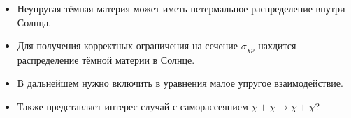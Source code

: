 \begin{itemize}
	\item Неупругая тёмная материя может иметь нетермальное распределение внутри Солнца.
	\item Для получения корректных ограничения на сечение $\sigma_{\chi p}$ нахдится распределение тёмной материи в Солнце.
	\item В дальнейшем нужно включить в уравнения малое упругое взаимодействие.
	\item Также представляет интерес случай с саморассеянием $\chi + \chi \rightarrow \chi + \chi$?
	
\end{itemize}